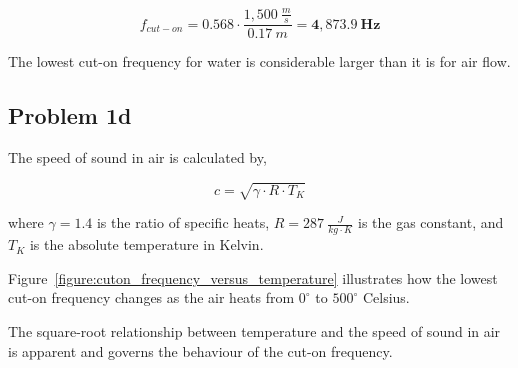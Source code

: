 \vspace{-0.25cm}
\begin{equation*}
    f_{cut-on} = 0.568 \cdot \frac{ 1,500~\frac{m}{s} }{ 0.17~m } = \boldsymbol{4,873.9~Hz}
\end{equation*}

The lowest cut-on frequency for water is considerable larger than it is for air flow.





\newpage
\subsection*{Problem 1d}

The speed of sound in air is calculated by,

\vspace{-0.25cm}
\begin{equation}
    c = \sqrt{ \gamma \cdot R \cdot T_K }
    \label{equation:speedOfSoundInAir}
\end{equation}

where $\gamma = 1.4$ is the ratio of specific heats, $R = 287~\frac{J}{kg \cdot K}$ is the gas constant, and $T_K$ is the absolute temperature in Kelvin.

\vspace{0.25cm}
Figure~\ref{figure:cuton_frequency_versus_temperature} illustrates how the lowest cut-on frequency changes as the air heats from $0^{\circ}$ to $500^{\circ}$ Celsius.

\vspace{0.25cm}
The square-root relationship between temperature and the speed of sound in air is apparent and governs the behaviour of the cut-on frequency.




